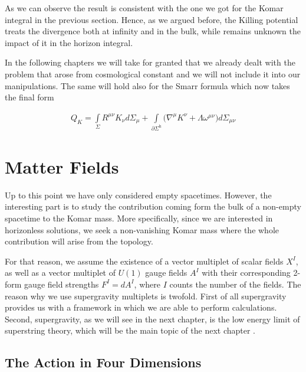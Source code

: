 \documentclass[a4paper,notitlepage]{report}
\begin{document}
\vspace{0.5 em}
As we can observe the result is consistent with the one we got for the Komar integral in the previous section. Hence, as we argued before, the Killing potential treats the divergence both at infinity and in the bulk, while remains unknown the impact of it in the horizon integral.

In the following chapters we will take for granted that we already dealt with the problem that arose from cosmological constant and we will not include it into our manipulations. The same will hold also for the Smarr formula which now takes the final form

\begin{align} \label{Smarr}
Q_{K} = \int\limits_{\Sigma} R^{\mu\nu} K_\nu d\Sigma_{\mu} + \int\limits_{\partial \Sigma^{\text{h}}} \Big( \nabla^{\mu} K^{\nu} + \Lambda \omega^{\mu\nu} \Big) d\Sigma_{\mu\nu}
\end{align}


\chapter{Matter Fields}

Up to this point we have only considered empty spacetimes. However, the interesting part is to study the contribution coming form the bulk of a non-empty spacetime to the Komar mass. More specifically, since we are interested in horizonless solutions, we seek a non-vanishing Komar mass where the whole contribution will arise from the topology.

For that reason, we assume the existence of a vector multiplet of scalar fields $X^{I}$, as well as a vector multiplet of $U(1)$ gauge fields $A^I$ with their corresponding 2-form gauge field strengths $F^{I} = dA^I$, where $I$ counts the number of the fields. The reason why we use supergravity multiplets is twofold. First of all supergravity provides us with a framework in which we are able to perform calculations. Second, supergravity, as we will see in the next chapter, is the low energy limit of superstring theory, which will be the main topic of the next chapter \cite{freedman2012supergravity,nastase2011introduction}.

\section{The Action in Four Dimensions}
\end{document}
